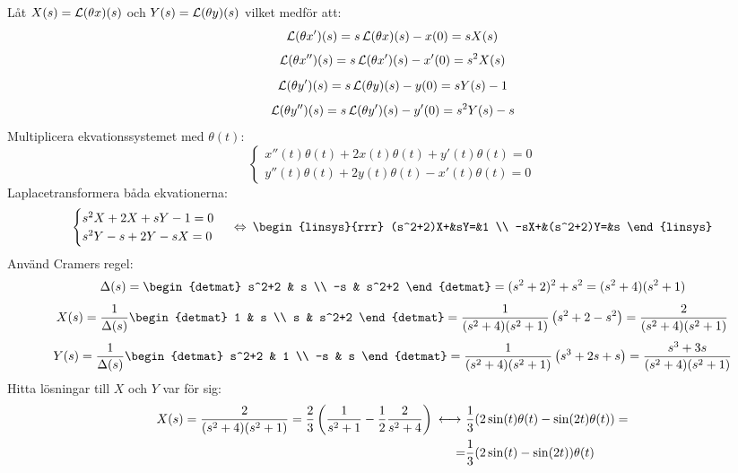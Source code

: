 \pagebreak
\begin{task}{5.14}
	Låt $X(s)=\operatorname{\mathcal{L}}(\theta x)(s)$ och $Y(s)=\operatorname{\mathcal{L}}(\theta y)(s)$ vilket medför att:
	\[\operatorname{\mathcal{L}}(\theta x')(s)=s\operatorname{\mathcal{L}}(\theta x)(s)-x(0)=sX(s)\]
	\[\operatorname{\mathcal{L}}(\theta x'')(s)=s\operatorname{\mathcal{L}}(\theta x')(s)-x'(0)=s^2X(s)\]
	\[\operatorname{\mathcal{L}}(\theta y')(s)=s\operatorname{\mathcal{L}}(\theta y)(s)-y(0)=sY(s)-1\]
	\[\operatorname{\mathcal{L}}(\theta y'')(s)=s\operatorname{\mathcal{L}}(\theta y')(s)-y'(0)=s^2Y(s)-s\]
	Multiplicera ekvationssystemet med $\theta(t)$:
	\[
	\begin{cases}
	x''(t)\theta(t)+2x(t)\theta(t)+y'(t)\theta(t)=0 \\
	y''(t)\theta(t)+2y(t)\theta(t)-x'(t)\theta(t)=0
	\end{cases}\]
	Laplacetransformera båda ekvationerna:
	\[
	\begin{cases}
	s^2X+2X+sY-1=0\\
	s^2Y-s+2Y-sX=0
	\end{cases} \lra
	\begin{linsys}{rrr}
	(s^2+2)X+&sY=&1 \\
	-sX+&(s^2+2)Y=&s
	\end{linsys}\]
	Använd Cramers regel:
	\begin{align*}
	\Delta(s)=\begin{detmat}
	s^2+2 & s \\
	-s & s^2+2
	\end{detmat}=
	(s^2+2)^2+s^2=
	(s^2+4)(s^2+1)
	\end{align*}
	\begin{align*}
	X(s)=
	\frac{1}{\Delta(s)}\begin{detmat}
	1 & s \\
	s & s^2+2
	\end{detmat}=
	\frac{1}{(s^2+4)(s^2+1)}\left(s^2+2-s^2\right)=
	\frac{2}{(s^2+4)(s^2+1)}
	\end{align*}
	\begin{align*}
	Y(s)=
	\frac{1}{\Delta(s)}\begin{detmat}
	s^2+2 & 1 \\
	-s & s
	\end{detmat}=
	\frac{1}{(s^2+4)(s^2+1)}\left(s^3+2s+s\right)=
	\frac{s^3+3s}{(s^2+4)(s^2+1)}
	\end{align*}
	Hitta lösningar till $X$ och $Y$ var för sig: 
	\begin{align*}
	X(s)=
	\frac{2}{(s^2+4)(s^2+1)}=
	\frac{2}{3}\left(\frac{1}{s^2+1}-\frac{1}{2}\*\frac{2}{s^2+4}\right)\llra
	&\frac{1}{3}(2\sin(t)\theta(t)-\sin(2t)\theta(t))= \\ =
	&\frac{1}{3}(2\sin(t)-\sin(2t))\theta(t)

\end{align*}
\end{task}
